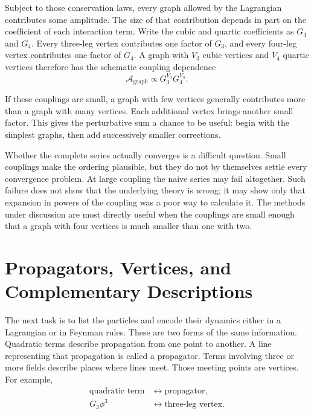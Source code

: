Subject to those conservation laws, every graph allowed by the Lagrangian contributes some amplitude. The size of that contribution depends in part on the coefficient of each interaction term. Write the cubic and quartic coefficients as \(G_3\) and \(G_4\). Every three-leg vertex contributes one factor of \(G_3\), and every four-leg vertex contributes one factor of \(G_4\). A graph with \(V_3\) cubic vertices and \(V_4\) quartic vertices therefore has the schematic coupling dependence
\begin{equation}
\mathcal{A}_{\mathrm{graph}}
\propto G_3^{V_3}G_4^{V_4}.
\end{equation}

If these couplings are small, a graph with few vertices generally contributes more than a graph with many vertices. Each additional vertex brings another small factor. This gives the perturbative sum a chance to be useful: begin with the simplest graphs, then add successively smaller corrections.

Whether the complete series actually converges is a difficult question. Small couplings make the ordering plausible, but they do not by themselves settle every convergence problem. At large coupling the naive series may fail altogether. Such failure does not show that the underlying theory is wrong; it may show only that expansion in powers of the coupling was a poor way to calculate it. The methods under discussion are most directly useful when the couplings are small enough that a graph with four vertices is much smaller than one with two.

\begin{classroomqa}
\end{classroomqa}

\section{Propagators, Vertices, and Complementary Descriptions}

The next task is to list the particles and encode their dynamics either in a Lagrangian or in Feynman rules. These are two forms of the same information. Quadratic terms describe propagation from one point to another. A line representing that propagation is called a propagator. Terms involving three or more fields describe places where lines meet. Those meeting points are vertices. For example,
\begin{equation}
\begin{aligned}
\text{quadratic term}
&\longleftrightarrow \text{propagator},\\
G_3\phi^3
&\longleftrightarrow \text{three-leg vertex}.
\end{aligned}
\end{equation}

